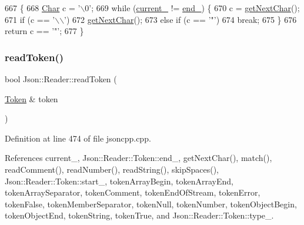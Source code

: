 \begin{DoxyCode}
667                         \{
668   \hyperlink{class_json_1_1_reader_a3eec9118f3e9a672ba8348c3a79d0f45}{Char} c = \textcolor{charliteral}{'\(\backslash\)0'};
669   \textcolor{keywordflow}{while} (\hyperlink{class_json_1_1_reader_a2f2feb5201a26da7aa133d2f7434479b}{current\_} != \hyperlink{class_json_1_1_reader_a714793579cbf4ee7c5a7223d2c8d77c1}{end\_}) \{
670     c = \hyperlink{class_json_1_1_reader_ab61eb61333cc9ec3afe785663a53ce90}{getNextChar}();
671     \textcolor{keywordflow}{if} (c == \textcolor{charliteral}{'\(\backslash\)\(\backslash\)'})
672       \hyperlink{class_json_1_1_reader_ab61eb61333cc9ec3afe785663a53ce90}{getNextChar}();
673     \textcolor{keywordflow}{else} \textcolor{keywordflow}{if} (c == \textcolor{charliteral}{'"'})
674       \textcolor{keywordflow}{break};
675   \}
676   \textcolor{keywordflow}{return} c == \textcolor{charliteral}{'"'};
677 \}
\end{DoxyCode}
\mbox{\label{class_json_1_1_reader_a7cb0631963cc0fd4ff6ed0f570976864}} 
\subsubsection{\texorpdfstring{read\+Token()}{readToken()}}
{\footnotesize\ttfamily bool Json\+::\+Reader\+::read\+Token (\begin{DoxyParamCaption}\item[{\hyperlink{class_json_1_1_reader_1_1_token}{Token} \&}]{token }\end{DoxyParamCaption})\hspace{0.3cm}{\ttfamily [private]}}



Definition at line 474 of file jsoncpp.\+cpp.



References current\+\_\+, Json\+::\+Reader\+::\+Token\+::end\+\_\+, get\+Next\+Char(), match(), read\+Comment(), read\+Number(), read\+String(), skip\+Spaces(), Json\+::\+Reader\+::\+Token\+::start\+\_\+, token\+Array\+Begin, token\+Array\+End, token\+Array\+Separator, token\+Comment, token\+End\+Of\+Stream, token\+Error, token\+False, token\+Member\+Separator, token\+Null, token\+Number, token\+Object\+Begin, token\+Object\+End, token\+String, token\+True, and Json\+::\+Reader\+::\+Token\+::type\+\_\+.



